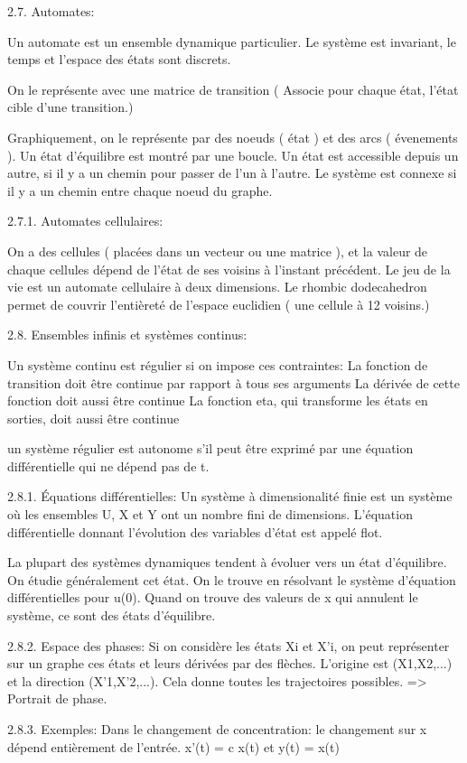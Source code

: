 2.7. Automates:

Un automate est un ensemble dynamique particulier. Le système est invariant, le temps et l’espace des états sont discrets.

On le représente avec une matrice de transition ( Associe pour chaque état, l’état cible d’une transition.)

Graphiquement, on le représente par des noeuds ( état ) et des arcs ( évenements ). Un état d’équilibre est montré par une boucle. Un état est accessible depuis un autre, si il y a un chemin pour passer de l’un à l’autre. Le système est connexe si il y a un chemin entre chaque noeud du graphe.

2.7.1. Automates cellulaires:

On a des cellules ( placées dans un vecteur ou une matrice ), et la valeur de chaque cellules dépend de l’état de ses voisins à l’instant précédent.
Le jeu de la vie est un automate cellulaire à deux dimensions.
Le rhombic dodecahedron permet de couvrir l’entièreté de l’espace euclidien ( une cellule à 12 voisins.)

2.8. Ensembles infinis et systèmes continus:

Un système continu est régulier si on impose ces contraintes:
La fonction de transition doit être continue par rapport à tous ses arguments
La dérivée de cette fonction doit aussi être continue
La fonction eta, qui transforme les états en sorties, doit aussi être continue

un système régulier est autonome s’il peut être exprimé par une équation différentielle qui ne dépend pas de t.

2.8.1. Équations différentielles:
Un système à dimensionalité finie est un système où les ensembles U, X et Y ont un nombre fini de dimensions.
L’équation différentielle donnant l’évolution des variables d’état est appelé flot.

La plupart des systèmes dynamiques tendent à évoluer vers un état d’équilibre. On étudie généralement cet état.
On le trouve en résolvant le système d’équation différentielles pour u(0). Quand on trouve des valeurs de x qui annulent le système, ce sont des états d’équilibre.

2.8.2. Espace des phases:
Si on considère les états Xi et X’i, on peut représenter sur un graphe ces états et leurs dérivées par des flèches. L’origine est (X1,X2,...) et la direction (X’1,X’2,...). Cela donne toutes les trajectoires possibles. => Portrait de phase.

2.8.3. Exemples:
Dans le changement de concentration: le changement sur x dépend entièrement de l’entrée.
x'(t) = c x(t) et y(t) = x(t)


